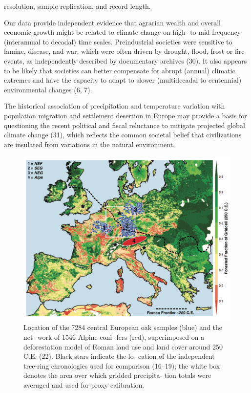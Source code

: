 \documentclass[10pt,a4paper,twoside,onecolumn]{article}
\begin{document}
\begin{myfont}
\begin{multicols}{3}
resolution, sample replication, and record length. \par
Our data provide independent evidence that agrarian wealth and overall economic growth might be related to climate change on high- to mid-frequency (interannual to decadal) time scales. Preindustrial societies were sensitive to famine, disease, and war, which were often driven by drought, flood, frost or fire events, as independently described by documentary archives (30). It also appears to be likely that societies can better compensate for abrupt (annual) climatic extremes and have the capacity to adapt to slower (multidecadal to centennial) environmental changes (6, 7). \par
The historical association of precipitation and temperature variation with population migration and settlement desertion in Europe may provide a basis for questioning the recent political and fiscal reluctance to mitigate projected global climate change (31), which reflects the common societal belief that civilizations are insulated from variations in the natural environment.


\begin{figure}[h] %
\includegraphics[width=1\textwidth]{BuntgenFig1}
\caption{Location of the 7284 central European oak samples (blue) and the net- work of 1546 Alpine coni- fers (red), superimposed on a deforestation model of Roman land use and land cover around 250 C.E. (22). Black stars indicate the lo- cation of the independent tree-ring chronologies used for comparison (16–19); the white box denotes the area over which gridded precipita- tion totals were averaged and used for proxy calibration.} %
\label{Fig1} %
\end{figure} %


\end{multicols}
\end{myfont}
\end{document}

